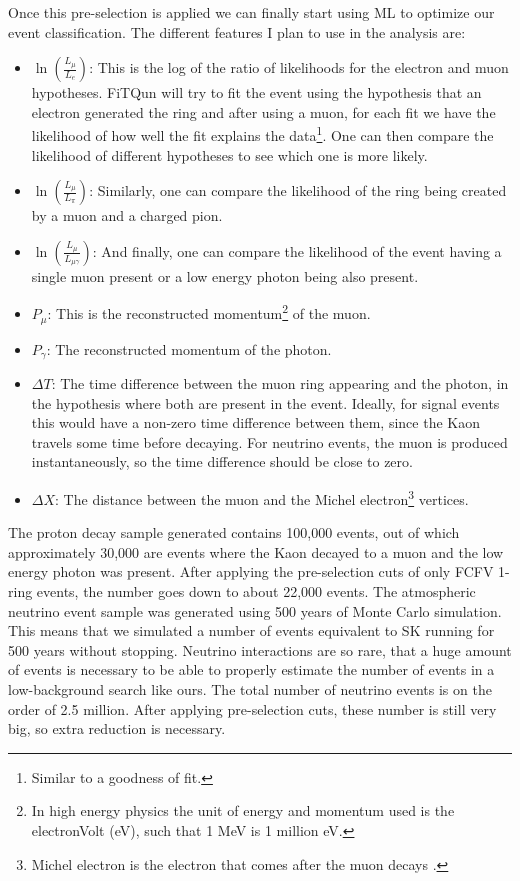 Once this pre-selection is applied we can finally start using ML to optimize our event classification. The different features I plan to use in the analysis are:
\begin{itemize}  
\item  $\ln{\left(\frac{L_{\mu}}{L_{e}}\right)}$: This is the log of the ratio of likelihoods for the electron and muon hypotheses. FiTQun will try to fit the event using the hypothesis that an electron generated the ring and after using a muon, for each fit we have the likelihood of how well the fit explains the data\footnote{Similar to a goodness of fit.}. One can then compare the likelihood of different hypotheses to see which one is more likely.
\item  $\ln{\left(\frac{L_{\mu}}{L_{\pi}}\right)}$: Similarly, one can compare the likelihood of the ring being created by a muon and a charged pion.
\item  $\ln{\left(\frac{L_{\mu}}{L_{\mu\gamma}}\right)}$: And finally, one can compare the likelihood of the event having a single muon present or a low energy photon being also present.
\item $P_{\mu}$: This is the reconstructed momentum\footnote{In high energy physics the unit of energy and momentum used is the electronVolt (eV), such that 1 MeV is 1 million eV.} of the muon.
\item $P_{\gamma}$: The reconstructed momentum of the photon.
\item $\Delta T$: The time difference between the muon ring appearing and the photon, in the hypothesis where both are present in the event. Ideally, for signal events this would have a non-zero time difference between them, since the Kaon travels some time before decaying. For neutrino events, the muon is produced instantaneously, so the time difference should be close to zero.
\item  $\Delta X$: The distance between the muon and the Michel electron\footnote{Michel electron is the electron that comes after the muon decays \cite{Michel}.} vertices. 
\end{itemize}

The proton decay sample generated contains 100,000 events, out of which approximately 30,000 are events where the Kaon decayed to a muon and the low energy photon was present. After applying the pre-selection cuts of only FCFV 1-ring events, the number goes down to about 22,000 events.
The atmospheric neutrino event sample was generated using 500 years of Monte Carlo simulation. This means that we simulated a number of events equivalent to SK running for 500 years without stopping. Neutrino interactions are so rare, that a huge amount of events is necessary to be able to properly estimate the number of events in a low-background search like ours. The total number of neutrino events is on the order of 2.5 million. After applying pre-selection cuts, these number is still very big, so extra reduction is necessary.

